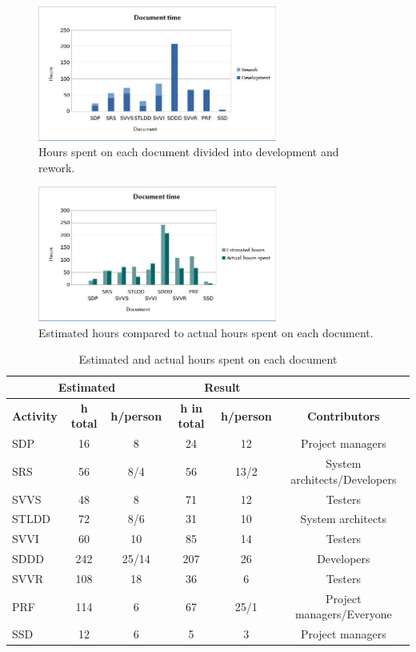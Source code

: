 \documentclass[a4paper]{article}
\begin{document}
\begin{figure}[h!]
\centering
\includegraphics[width=0.7\textwidth]{dev-re.jpg}
\caption{Hours spent on each document divided into development and rework.}
\label{fig:dev-re}
\end{figure}

\begin{figure}[h!]
\centering
\includegraphics[width=0.7\textwidth]{doc.jpg}
\caption{Estimated hours compared to actual hours spent on each document.}
\label{fig:doc}
\end{figure}

\FloatBarrier

\begin{table}[h!]
\centering
\caption{Estimated and actual hours spent on each document}
\begin{tabular}{|l|c|c||c|c|c|}
 \hline
 
\multicolumn{3}{|c||}{\textbf{Estimated}} & \multicolumn{2}{|c|}{\textbf{Result}} & \multicolumn{1}{|c|}{\textbf{}}\\ \hline \hline
\textbf{Activity} & \textbf{h total} & \textbf{h/person} & \textbf{h in total} & \textbf{h/person} & \textbf{Contributors} \\ \hline
SDP & 16 & 8 & 24 & 12 & Project managers \\ \hline
SRS & 56 & 8/4 & 56 & 13/2 & System architects/Developers\\ \hline
SVVS & 48 & 8 & 71 & 12 & Testers \\ \hline
STLDD & 72 & 8/6 & 31 & 10 & System architects\\ \hline
SVVI & 60 & 10 & 85 &14 & Testers\\ \hline 
SDDD & 242 & 25/14 & 207 & 26 & Developers\\ \hline
SVVR & 108 & 18 & 36 & 6 & Testers\\ \hline
PRF & 114 & 6 & 67 & 25/1 & Project managers/Everyone\\ \hline
SSD & 12 & 6 & 5 & 3 & Project managers \\ \hline

\end{tabular}
\label{table:time}
\end{table}
\end{document}
